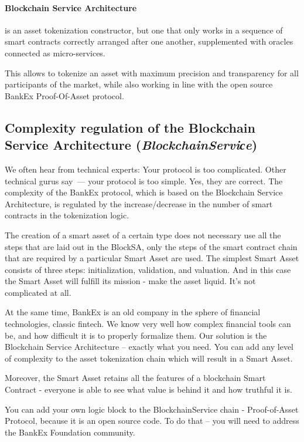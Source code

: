 \documentclass{article}
\begin{document}
\begin{multicols}{2}
\paragraph*{Blockchain Serviсe Architecture} is an asset tokenization constructor, but one that only works in a sequence of smart contracts correctly arranged after one another, supplemented with oracles connected as micro-services. 

This allows to tokenize an asset with maximum precision and transparency for all participants of the market, while also working in line with the open source BankEx Proof-Of-Asset protocol.

\subsection{Complexity regulation of the Blockchain Serviсe Architecture (\textit{BlockchainServiсe})}

We often hear from technical experts: Your protocol is too complicated. Other technical gurus say~--- your protocol is too simple. Yes, they are correct. The complexity of the BankEx protocol, which is based on the Blockchain Service Architecture, is regulated by the increase/decrease in the number of smart contracts in the tokenization logic. 

The creation of a smart asset of a certain type does not necessary use all the steps that are laid out in the BlockSA, only the steps of the smart contract chain that are required by a particular Smart Asset are used. The simplest Smart Asset consists of three steps: initialization, validation, and valuation. And in this case the Smart Asset will fulfill its mission - make the asset liquid. It’s not complicated at all. 

At the same time, BankEx is an old company in the sphere of financial technologies, classic fintech. We know very well how complex financial tools can be, and how difficult it is to properly formalize them. Our solution is the Blockchain Service Architecture – exactly what you need. You can add any level of complexity to the asset tokenization chain which will result in a Smart Asset.

Moreover, the Smart Asset retains all the features of a blockchain Smart Contract - everyone is able to see what value is behind it and how truthful it is. 

You can add your own logic block to the BlockchainService chain - Proof-of-Asset Protocol, because it is an open source code. To do that – you will need to address the BankEx Foundation community.



\end{multicols}
\end{document}
